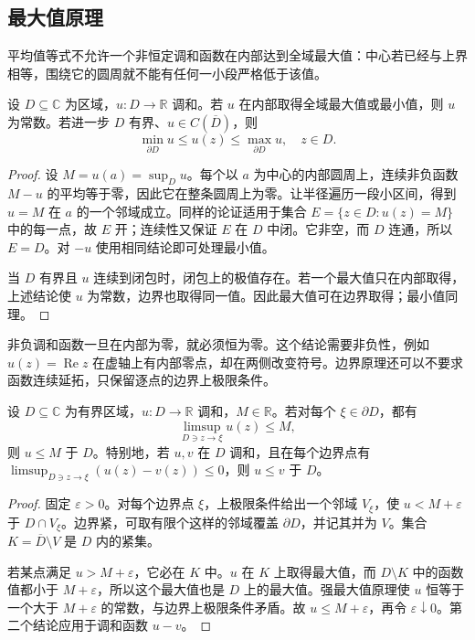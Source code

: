 \subsection{最大值原理}
\label{b3:subsec:150103}

平均值等式不允许一个非恒定调和函数在内部达到全域最大值：中心若已经与上界相等，围绕它的圆周就不能有任何一小段严格低于该值。

\begin{theorem}[强最大值原理]\label{b3:thm:15-maximum}
设 \(D\subseteq\mathbb C\) 为区域，\(u:D\to\mathbb R\) 调和。若 \(u\) 在内部取得全域最大值或最小值，则 \(u\) 为常数。若进一步 \(D\) 有界、\(u\in C(\overline D)\)，则
\[
 \min_{\partial D}u\le u(z)\le\max_{\partial D}u,
 \quad z\in D.
\]
\end{theorem}
\begin{proof}
设 \(M=u(a)=\sup_Du\)。每个以 \(a\) 为中心的内部圆周上，连续非负函数 \(M-u\) 的平均等于零，因此它在整条圆周上为零。让半径遍历一段小区间，得到 \(u=M\) 在 \(a\) 的一个邻域成立。同样的论证适用于集合 \(E=\{z\in D:u(z)=M\}\) 中的每一点，故 \(E\) 开；连续性又保证 \(E\) 在 \(D\) 中闭。它非空，而 \(D\) 连通，所以 \(E=D\)。对 \(-u\) 使用相同结论即可处理最小值。

当 \(D\) 有界且 \(u\) 连续到闭包时，闭包上的极值存在。若一个最大值只在内部取得，上述结论使 \(u\) 为常数，边界也取得同一值。因此最大值可在边界取得；最小值同理。
\end{proof}

非负调和函数一旦在内部为零，就必须恒为零。这个结论需要非负性，例如 \(u(z)=\operatorname{Re}z\) 在虚轴上有内部零点，却在两侧改变符号。边界原理还可以不要求函数连续延拓，只保留逐点的边界上极限条件。

\begin{corollary}[边界上极限形式]\label{b3:cor:15-boundary-limsup}
设 \(D\subseteq\mathbb C\) 为有界区域，\(u:D\to\mathbb R\) 调和，\(M\in\mathbb R\)。若对每个 \(\xi\in\partial D\)，都有
\[
 \limsup_{D\ni z\to\xi}u(z)\le M,
\]
则 \(u\le M\) 于 \(D\)。特别地，若 \(u,v\) 在 \(D\) 调和，且在每个边界点有 \(\limsup_{D\ni z\to\xi}(u(z)-v(z))\le0\)，则 \(u\le v\) 于 \(D\)。
\end{corollary}
\begin{proof}
固定 \(\varepsilon>0\)。对每个边界点 \(\xi\)，上极限条件给出一个邻域 \(V_\xi\)，使 \(u<M+\varepsilon\) 于 \(D\cap V_\xi\)。边界紧，可取有限个这样的邻域覆盖 \(\partial D\)，并记其并为 \(V\)。集合 \(K=\overline D\setminus V\) 是 \(D\) 内的紧集。

若某点满足 \(u>M+\varepsilon\)，它必在 \(K\) 中。\(u\) 在 \(K\) 上取得最大值，而 \(D\setminus K\) 中的函数值都小于 \(M+\varepsilon\)，所以这个最大值也是 \(D\) 上的最大值。强最大值原理使 \(u\) 恒等于一个大于 \(M+\varepsilon\) 的常数，与边界上极限条件矛盾。故 \(u\le M+\varepsilon\)，再令 \(\varepsilon\downarrow0\)。第二个结论应用于调和函数 \(u-v\)。
\end{proof}

